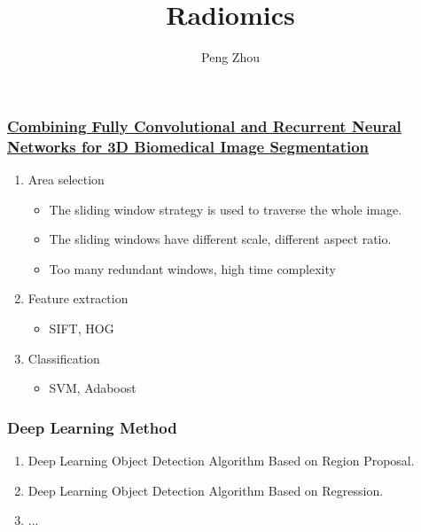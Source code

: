 \documentclass{beamer}
\begin{document}
\title{Radiomics}
\author{Peng Zhou}
\date{}
\maketitle{}

\begin{frame}
  \frametitle{\href{https://arxiv.org/pdf/1609.01006v2.pdf}
    {Combining Fully Convolutional and Recurrent Neural Networks for 3D Biomedical Image Segmentation}}

  \begin{enumerate}

  \item Area selection
    \begin{itemize}
    \item The sliding window strategy is used to traverse the whole image. 
    \item The sliding windows have different scale, different aspect ratio.
    \item Too many redundant windows, high time complexity
    \end{itemize}

  \item Feature extraction
    \begin{itemize}
    \item SIFT, HOG
    \end{itemize}

  \item Classification
    \begin{itemize}
    \item SVM, Adaboost
    \end{itemize}
  \end{enumerate}
\end{frame}

\begin{frame}
  \frametitle{Deep Learning Method}
  \begin{block}{}
    \begin{enumerate}
    \item Deep Learning Object Detection Algorithm Based on Region Proposal.
    \item Deep Learning Object Detection Algorithm Based on Regression.
    \item ...
    \end{enumerate}
  \end{block}
\end{frame}
\end{document}
